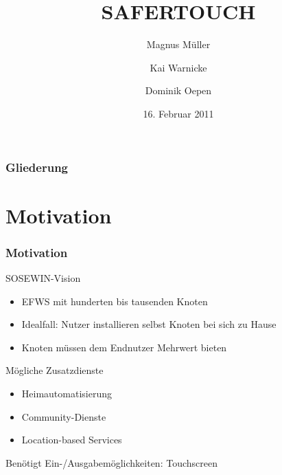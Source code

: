 \documentclass{beamer}
\title{SAFERTOUCH}
\institute[{Humboldt-Universität zu Berlin}]{\inst{}Humboldt-Universität zu Berlin}
\author[Magnus Müller \and Kai Warnicke \and Dominik Oepen]{Magnus Müller \and Kai Warnicke \and Dominik Oepen}
\date[16.02.2011]{16. Februar 2011}
\begin{document}
	\begin{frame}
		\titlepage
	\end{frame}

	\begin{frame}
		\frametitle{Gliederung}
		\tableofcontents
	\end{frame}	

  \section{Motivation}
	\begin{frame}
		\frametitle{Motivation}
		\begin{block}{SOSEWIN-Vision}
		\begin{itemize}
			\item EFWS mit hunderten bis tausenden Knoten
			\item Idealfall: Nutzer installieren selbst Knoten bei sich zu Hause
			\item Knoten müssen dem Endnutzer Mehrwert bieten
		\end{itemize}
		\end{block}
		\pause
		\begin{block}{Mögliche Zusatzdienste}
			\begin{itemize}
				\item Heimautomatisierung
				\item Community-Dienste
				\item Location-based Services
			\end{itemize}
		\end{block}
		\pause
		Benötigt Ein-/Ausgabemöglichkeiten: Touchscreen
	\end{frame}
\end{document}
